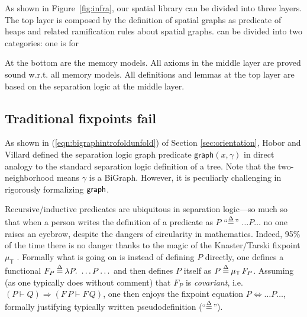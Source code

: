 As shown in Figure~\ref{fig:infra}, our spatial library can be divided
into three layers. The top layer is composed by the definition of
spatial graphs as predicate of heaps and related ramification rules
about spatial graphs. can be divided into two categories: one is for

At the bottom are the memory models. All axioms in the middle layer
are proved sound w.r.t. all memory models. All definitions and lemmas
at the top layer are based on the separation logic at the middle
layer.




\subsection{Traditional fixpoints fail}\label{sec:fixpointfail}

As shown in (\ref{eqn:bigraphintrofoldunfold}) of Section
\ref{sec:orientation}, Hobor and Villard\cite{hobor:ramification}
defined the separation logic graph predicate
$\mathsf{graph}(x,\gamma)$ in direct analogy to the standard
separation logic definition of a tree. Note that the two-neighborhood
means $\gamma$ is a BiGraph. However, it is peculiarly challenging in
rigorously formalizing $\mathsf{graph}$.


Recursive/inductive predicates are ubiquitous in separation logic---so
much so that when a person writes the definition of a predicate as $P$
``$\mathbin{\stackrel{\Delta}{=}}$'' $\ldots P \ldots$ no one raises an eyebrow, despite the
dangers of circularity in mathematics. Indeed, 95\% of the time there
is no danger thanks to the magic of the Knaster/Tarski fixpoint
$\mu_{\mathsf{T}}$ \cite{tarski:fixpoint}. Formally what is going on
is instead of defining $P$ directly, one defines a functional $F_P
\mathbin{\stackrel{\Delta}{=}} \lambda P.~ \ldots P \ldots$ and then defines $P$ itself as $P
\mathbin{\stackrel{\Delta}{=}} \mu_{\mathsf{T}} \, F_P$.  Assuming (as one typically does
without comment) that $F_P$ is \emph{covariant}, i.e. $(P \vdash Q)
\Rightarrow (F \, P \vdash F \, Q)$, one then enjoys the fixpoint
equation $P \Leftrightarrow \ldots P \ldots$, formally justifying
typically written pseudodefinition (``$\mathbin{\stackrel{\Delta}{=}}$'').

